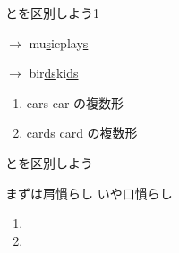 \documentclass[aspectratio=169,xcolor={dvipsnames,table}]{beamer}
\begin{document}
\begin{frame}[plain]{とを区別しよう1}
\Large

 $\rightarrow$ \hspace{95pt}\pause{}mu\underline{s}ic\hspace{10pt}play\underline{s}

\pause

 $\rightarrow$ \hspace{80pt}\pause{}bir\underline{ds}\hspace{10pt}ki\underline{ds}

\vfill

\pause

 \begin{enumerate}
  \item cars \hfill{\scriptsize car の複数形}
  \item cards \hfill{\scriptsize card  の複数形} 

 \end{enumerate}

\hfill{}


\end{frame}
\begin{frame}[plain]{とを区別しよう}


まずは肩慣らし\pause{} いや口慣らし\pause

\Large

\begin{enumerate}
 \item {}\pause
 \item {}
\end{enumerate}

\end{frame}
\end{document}
